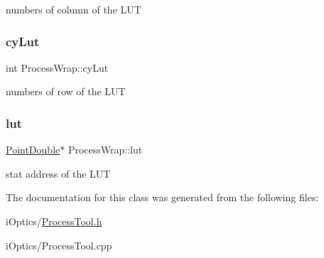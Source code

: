 numbers of column of the L\+UT \mbox{\label{class_process_wrap_ab18b53afcd7d7b0d941a45a9c89e177c}} 
\subsubsection{\texorpdfstring{cy\+Lut}{cyLut}}
{\footnotesize\ttfamily int Process\+Wrap\+::cy\+Lut\hspace{0.3cm}{\ttfamily [protected]}}

numbers of row of the L\+UT \mbox{\label{class_process_wrap_a39358a35e911d631f6bd46f6bf815d25}} 
\subsubsection{\texorpdfstring{lut}{lut}}
{\footnotesize\ttfamily \mbox{\hyperlink{struct___point_double}{Point\+Double}}$\ast$ Process\+Wrap\+::lut\hspace{0.3cm}{\ttfamily [protected]}}

stat address of the L\+UT 

The documentation for this class was generated from the following files\+:\begin{DoxyCompactItemize}
\item 
i\+Optics/\mbox{\hyperlink{_process_tool_8h}{Process\+Tool.\+h}}\item 
i\+Optics/Process\+Tool.\+cpp\end{DoxyCompactItemize}
